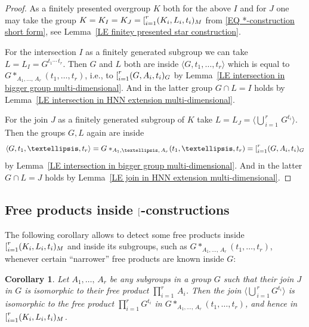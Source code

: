 \documentclass[12pt, a4paper]{amsart}
\newcommand{\1}{\{1\}}
\newcommand{\bigast}{\textrm{\footnotesize\ding{91}}}
\theoremstyle{plain}
\newtheorem{Corollary}[Theorem]{Corollary}
\theoremstyle{definition}
\theoremstyle{remark}
\numberwithin{equation}{section}
\begin{document}
\begin{proof}
As a finitely presented overgroup $K$ both for the above $I$ and for $J$ one may take the group $K=K_I=K_J=\textstyle{\bigast}_{i=1}^{r}(K_i, L_i, t_i)_M$ from \eqref{EQ *-construction short form}, see Lemma~\ref{LE finitey presented star construction}. 

For the intersection $I$ as a finitely generated subgroup we can take $L=L_I= G^{t_1 \cdots\, t_r}$. Then
$G$ and $L$ both are inside $\langle G, t_1,\ldots,t_r \rangle$ which is equal to $G *_{A_1,\ldots,\,A_r } \!(t_1,\ldots,t_r)$, i.e., to $\bigast_{i=1}^{r}(G, A_i, t_i)_G$
by Lemma~\ref{LE intersection in bigger group multi-dimensional}. And in the latter group 
$G \cap L = I$ holds by Lemma~\ref{LE intersection in HNN extension multi-dimensional}.

For the join $J$ as a finitely generated subgroup of $K$ take $L=L_J= \big\langle 
\bigcup_{\,i=1}^{\,r} \,G^{t_i} \big\rangle$. Then the groups
$G,L$ again are inside 
$$\textstyle 
\langle G, t_1,\ldots,t_r  \rangle=G *_{A_1,\ldots,\,A_r } \!(t_1,\ldots,t_r)={\bigast_{i=1}^{r}}(G, A_i, t_i)_G$$
by Lemma~\ref{LE intersection in bigger group multi-dimensional}. And in the latter  
$G \cap L = J$ holds by Lemma~\ref{LE join in HNN extension multi-dimensional}.
\end{proof}






\subsection{Free products inside $\bigast$-constructions}
\label{SU Free products inside} 
The following corollary allows to detect some free products inside $\bigast_{i=1}^{r}(K_i, L_i, t_i)_M$ and inside its subgroups, such as $G  *_{A_1,\ldots,\,A_r } \!(t_1,\ldots,t_r)$, whenever certain ``narrower'' free products are known inside $G$:

\begin{Corollary}
\label{CO smaller free product to the larger free product}
Let $A_1,\ldots,\,A_r$ be any subgroups in a group $G$ such that their join $J$ in $G$ is isomorphic to their free product
$\prod_{i=1}^{r} \,A_i$.  
Then the join
$\big\langle 
\bigcup_{\,i=1}^{\,r} G^{t_i} \big\rangle$
is isomorphic to the free product $\prod_{i=1}^{r} G^{t_i}$
in $G *_{A_1,\ldots,\,A_r } \!(t_1,\ldots,t_r)$, and hence in $\bigast_{i=1}^{r}(K_i, L_i, t_i)_M$.
\end{Corollary} 
\end{document}
